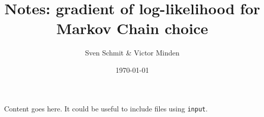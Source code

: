 \title{Notes: gradient of log-likelihood for Markov Chain choice}
\author{Sven Schmit \& Victor Minden}
\date{\today}



    \maketitle

    Content goes here. It could be useful to include files using
    \texttt{input}.

    
    


